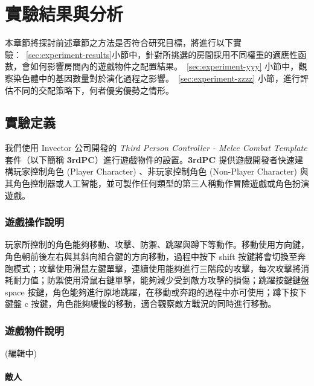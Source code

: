 \renewcommand\thetable{\arabic{chapter}-\arabic{table}}
\chapter{實驗結果與分析}
\label{cha:experiment}

本章節將探討前述章節之方法是否符合研究目標，將進行以下實驗：~\ref{sec:experiment-results}小節中，針對所挑選的房間採用不同權重的適應性函數，會如何影響房間內的遊戲物件之配置結果。~\ref{sec:experiment-yyy} 小節中，觀察染色體中的基因數量對於演化過程之影響。~\ref{sec:experiment-zzzz} 小節，進行評估不同的交配策略下，何者優劣優勢之情形。

\section{實驗定義}
\label{sec:experiment-definition}

我們使用 Invector 公司開發的 \textit{Third Person Controller - Melee Combat Template} 套件（以下簡稱 \textbf{3rdPC}）進行遊戲物件的設置。\textbf{3rdPC} 提供遊戲開發者快速建構玩家控制角色 (Player Character) 、非玩家控制角色 (Non-Player Character) 與其角色控制器或人工智能，並可製作任何類型的第三人稱動作冒險遊戲或角色扮演遊戲。

\subsection{遊戲操作說明}
\label{ssec:experiment-gameplaymanual}

玩家所控制的角色能夠移動、攻擊、防禦、跳躍與蹲下等動作。移動使用方向鍵，角色朝前後左右與其斜向組合鍵的方向移動，過程中按下 shift 按鍵將會切換至奔跑模式；攻擊使用滑鼠左鍵單擊，連續使用能夠進行三階段的攻擊，每次攻擊將消耗耐力值；防禦使用滑鼠右鍵單擊，能夠減少受到敵方攻擊的損傷；跳躍按鍵鍵盤 space 按鍵，角色能夠進行原地跳躍，在移動或奔跑的過程中亦可使用；蹲下按下鍵盤 c 按鍵，角色能夠緩慢的移動，適合觀察敵方戰況的同時進行移動。

\subsection{遊戲物件說明}
\label{ssec:experiment-gameobjects}

(編輯中)

\subsubsection{敵人}
\label{sssec:experiment-gameobjects-enemy}

